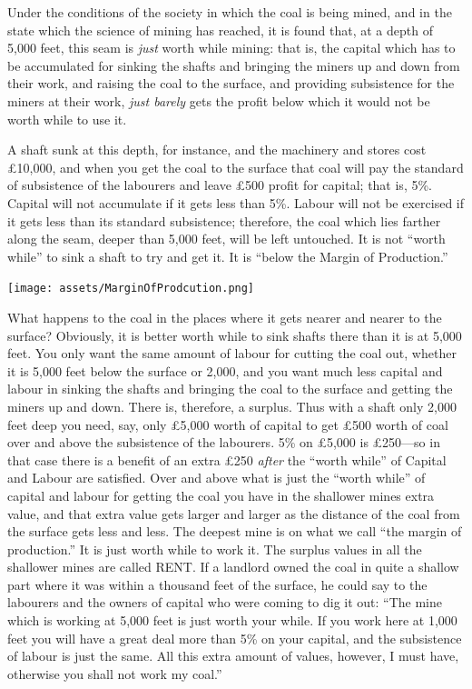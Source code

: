\documentclass{book}
\begin{document}
Under the conditions of the society in which the coal is being mined, and in the state which the science of mining has reached, it is found that, at a depth of 5,000 feet, this seam is \emph{just} worth while mining: that is, the capital which has to be accumulated for sinking the shafts and bringing the miners up and down from their work, and raising the coal to the surface, and providing subsistence for the miners at their work, \emph{just barely} gets the profit below which it would not be worth while to use it.

A shaft sunk at this depth, for instance, and the machinery and stores cost £10,000, and when you get the coal to the surface that coal will pay the standard of subsistence of the labourers and leave £500 profit for capital; that is, 5\%. Capital will not accumulate if it gets less than 5\%. Labour will not be exercised if it gets less than its standard subsistence; therefore, the coal which lies farther along the seam, deeper than 5,000 feet, will be left untouched. It is not “worth while” to sink a shaft to try and get it. It is “below the Margin of Production.”

\begin{center}
	\texttt{[image: assets/MarginOfProdcution.png]}
\end{center}

What happens to the coal in the places where it gets nearer and nearer to the surface? Obviously, it is better worth while to sink shafts there than it is at 5,000 feet. You only want the same amount of labour for cutting the coal out, whether it is 5,000 feet below the surface or 2,000, and you want much less capital and labour in sinking the shafts and bringing the coal to the surface and getting the miners up and down. There is, therefore, a surplus. Thus with a shaft only 2,000 feet deep you need, say, only £5,000 worth of capital to get £500 worth of coal over and above the subsistence of the labourers. 5\% on £5,000 is £250—so in that case there is a benefit of an extra £250 \emph{after} the “worth while” of Capital and Labour are satisfied. Over and above what is just the “worth while” of capital and labour for getting the coal you have in the shallower mines extra value, and that extra value gets larger and larger as the distance of the coal from the surface gets less and less. The deepest mine is on what we call “the margin of production.” It is just worth while to work it. The surplus values in all the shallower mines are called RENT. If a landlord owned the coal in quite a shallow part where it was within a thousand feet of the surface, he could say to the labourers and the owners of capital who were coming to dig it out: “The mine which is working at 5,000 feet is just worth your while. If you work here at 1,000 feet you will have a great deal more than 5\% on your capital, and the subsistence of labour is just the same. All this extra amount of values, however, I must have, otherwise you shall not work my coal.”
\end{document}

